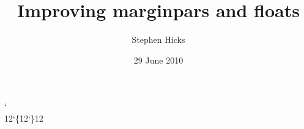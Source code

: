 \documentclass{beamer}
\title{Improving marginpars and floats}
\author{Stephen Hicks}
\date{29 June 2010}
\def\inputsrc#1{{%
  \catcode`\\12\catcode`\{12\catcode`\}12%
  \obeylines\obeyspaces\ttfamily
  
}}
\begin{document}
\begin{frame}[fragile]
\inputsrc{margins-bad}
\end{frame}
\end{document}
